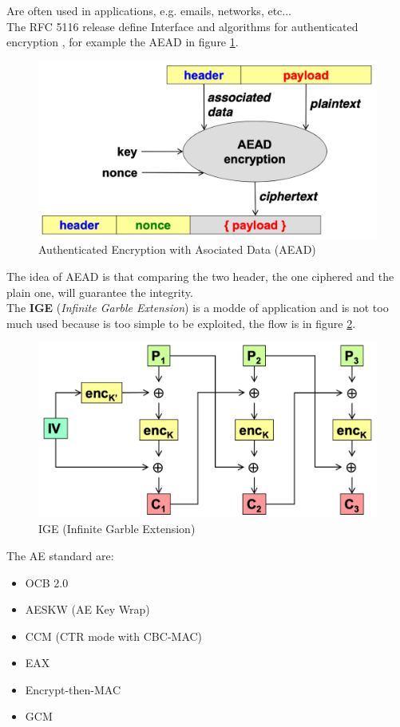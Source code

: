 \documentclass[12pt]{article}
\begin{document}
Are often used in applications, e.g. emails, networks, etc...\\
The RFC 5116 release define Interface and algorithms for authenticated encryption , for example the AEAD in figure \ref{fig:aead}.
\begin{figure}[H]
   \centering
   \includegraphics[width=\linewidth]{images/aead.png}
   \caption{Authenticated Encryption with Asociated Data (AEAD)}
   \label{fig:aead}
\end{figure}
The idea of AEAD is that comparing the two header, the one ciphered and the plain one, will guarantee the integrity.\\
The \textbf{IGE} (\textit{Infinite Garble Extension}) is a modde of application and is not too much used because is too simple to be exploited, the flow is in figure \ref{fig:ige}.
\begin{figure}[H]
   \centering
   \includegraphics[width=\linewidth]{images/ige.png}
   \caption{IGE (Infinite Garble Extension)}
   \label{fig:ige}
\end{figure}
The AE standard are:
\begin{itemize}
  \item OCB 2.0
  \item AESKW (AE Key Wrap)
  \item CCM (CTR mode with CBC-MAC)
  \item EAX
  \item Encrypt-then-MAC
  \item GCM
\end{itemize}
\end{document}
